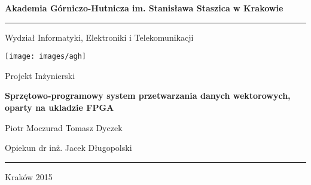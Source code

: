 \begin{titlepage}
    \begin{center}

        \textbf{Akademia Górniczo-Hutnicza im. Stanisława Staszica w Krakowie}
        \rule{\textwidth}{1pt}\par
        \vspace{0.5cm}
        Wydział Informatyki, Elektroniki i Telekomunikacji
        
        \vspace{1.5cm}

        \texttt{[image: images/agh]}
 		
 		\vspace{1.5cm}
 		
 		Projekt Inżynierski
 		
 		\vspace{0.5cm}
	 	\textbf{Sprzętowo-programowy system przetwarzania danych wektorowych, oparty na ukladzie FPGA}
		
		Piotr Moczurad
		Tomasz Dyczek
		
		Opiekun
		dr inż. Jacek Długopolski
		\rule{\textwidth}{1pt}\par
		Kraków 2015
		
        
    \end{center}
\end{titlepage}
